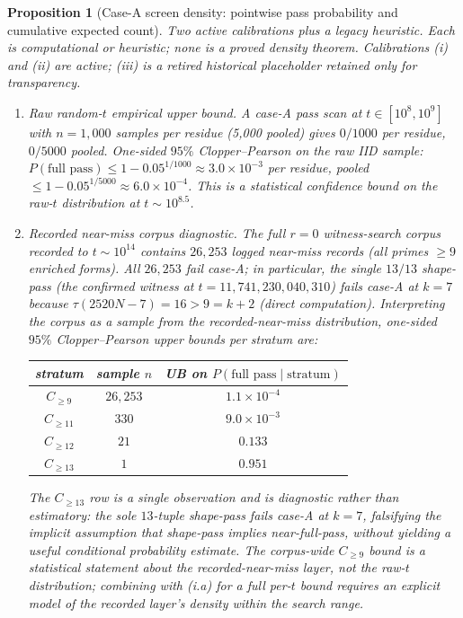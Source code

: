 \documentclass[11pt]{article}
\renewcommand{\_}{\origunderscore\allowbreak}
\newtheorem{proposition}[theorem]{Proposition}
\theoremstyle{definition}
\theoremstyle{remark}
\begin{document}
\begin{proposition}[Case-A screen density: pointwise pass probability and cumulative expected count]
\emph{Two active calibrations plus a legacy heuristic.} Each is
computational or heuristic; none is a proved density theorem.
Calibrations (i) and (ii) are active; (iii) is a retired
historical placeholder retained only for transparency.
\begin{enumerate}
\item[(i.a)] \emph{Raw random-$t$ empirical upper bound.}  A case-A
pass scan at $t\in[10^8, 10^9]$ with $n=1{,}000$ samples per
residue (5{,}000 pooled) gives $0/1000$ per residue, $0/5000$
pooled.  One-sided $95\%$ Clopper--Pearson on the raw IID sample:
$P(\text{full pass})\le 1-0.05^{1/1000}\approx 3.0\times 10^{-3}$
per residue, pooled $\le 1-0.05^{1/5000}\approx 6.0\times 10^{-4}$.
This is a statistical confidence bound on the raw-$t$ distribution
at $t\sim 10^{8.5}$.

\item[(i.b)] \emph{Recorded near-miss corpus diagnostic.}  The
full $r=0$ witness-search corpus recorded to $t\sim 10^{14}$
contains $26{,}253$ logged near-miss records (all primes $\ge 9$
enriched forms).  All $26{,}253$ fail case-A; in particular, the
single $13/13$ shape-pass (the confirmed witness at
$t=11{,}741{,}230{,}040{,}310$) fails case-A at $k=7$ because
$\tau(2520N - 7) = 16 > 9 = k+2$ (direct computation).
Interpreting the corpus as a sample from the recorded-near-miss
distribution, one-sided $95\%$ Clopper--Pearson upper bounds per
stratum are:

\begin{center}
\begin{tabular}{c|cc}
\hline
stratum & sample $n$ & UB on $P(\text{full pass}\mid\text{stratum})$ \\
\hline
$C_{\ge 9}$  & $26{,}253$ & $1.1\times 10^{-4}$ \\
$C_{\ge 11}$ & $330$      & $9.0\times 10^{-3}$ \\
$C_{\ge 12}$ & $21$       & $0.133$ \\
$C_{\ge 13}$ & $1$        & $0.951$ \\
\hline
\end{tabular}
\end{center}

\noindent The $C_{\ge 13}$ row is a single observation and is
diagnostic rather than estimatory: the sole $13$-tuple shape-pass
fails case-A at $k=7$, falsifying the implicit assumption that
shape-pass implies near-full-pass, without yielding a useful
conditional probability estimate.  The corpus-wide $C_{\ge 9}$
bound is a statistical statement about the \emph{recorded-near-miss
layer}, not the raw-$t$ distribution; combining with (i.a) for a
full per-$t$ bound requires an explicit model of the recorded
layer's density within the search range.


\end{enumerate}
\end{proposition}
\end{document}
